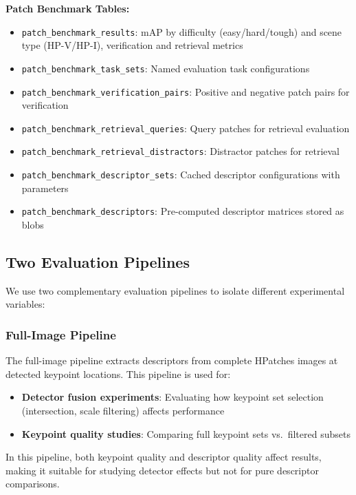 \textbf{Patch Benchmark Tables:}
\begin{itemize}
    \item \texttt{patch\_benchmark\_results}: mAP by difficulty (easy/hard/tough) and scene type (HP-V/HP-I), verification and retrieval metrics
    \item \texttt{patch\_benchmark\_task\_sets}: Named evaluation task configurations
    \item \texttt{patch\_benchmark\_verification\_pairs}: Positive and negative patch pairs for verification
    \item \texttt{patch\_benchmark\_retrieval\_queries}: Query patches for retrieval evaluation
    \item \texttt{patch\_benchmark\_retrieval\_distractors}: Distractor patches for retrieval
    \item \texttt{patch\_benchmark\_descriptor\_sets}: Cached descriptor configurations with parameters
    \item \texttt{patch\_benchmark\_descriptors}: Pre-computed descriptor matrices stored as blobs
\end{itemize}

\subsection{Two Evaluation Pipelines}

We use two complementary evaluation pipelines to isolate different experimental variables:

\subsubsection{Full-Image Pipeline}

The full-image pipeline extracts descriptors from complete HPatches images at detected keypoint locations. This pipeline is used for:
\begin{itemize}
    \item \textbf{Detector fusion experiments}: Evaluating how keypoint set selection (intersection, scale filtering) affects performance
    \item \textbf{Keypoint quality studies}: Comparing full keypoint sets vs.\ filtered subsets
\end{itemize}

In this pipeline, both keypoint quality and descriptor quality affect results, making it suitable for studying detector effects but not for pure descriptor comparisons.

